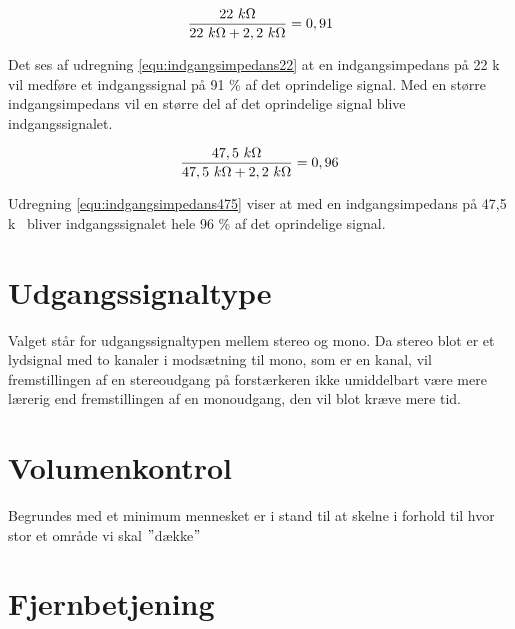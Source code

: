 \begin{equation}
\label{equ:indgangsimpedans22}
\frac{22~k\ohm}{22~k\ohm + 2,2~k\ohm} = 0,91
\end{equation}

Det ses af udregning \ref{equ:indgangsimpedans22} at en indgangsimpedans på 22 k\ohm~ vil medføre et indgangssignal på 91 \% af det oprindelige signal. Med en større indgangsimpedans vil en større del af det oprindelige signal blive indgangssignalet. 

\begin{equation}
\label{equ:indgangsimpedans475}
\frac{47,5~k\ohm}{47,5~k\ohm + 2,2~k\ohm} = 0,96
\end{equation}

Udregning \ref{equ:indgangsimpedans475} viser at med en indgangsimpedans på 47,5 k\ohm~ bliver indgangssignalet hele 96 \% af det oprindelige signal.

\section{Udgangssignaltype}
\label{krav_udgangssignaltype}
Valget står for udgangssignaltypen mellem stereo og mono. Da stereo blot er et lydsignal med to kanaler i modsætning til mono, som er en kanal, vil fremstillingen af en stereoudgang på forstærkeren ikke umiddelbart være mere lærerig end fremstillingen af en monoudgang, den vil blot kræve mere tid. 

\section{Volumenkontrol}
\label{krav_volumenkontrol}
Begrundes med et minimum mennesket er i stand til at skelne i forhold til hvor stor et område vi skal $"$dække$"$

\section{Fjernbetjening}
\label{krav_fjernbetjening}
